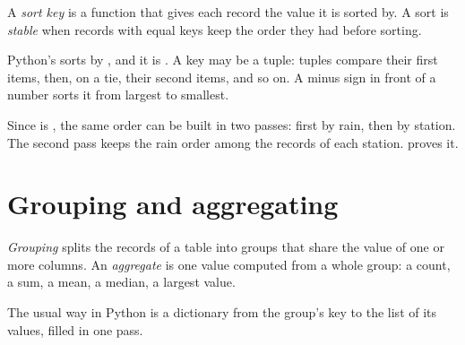 \begin{definition}\label{def:g10:data-tables:sort-key}
A \emph{sort key} is a function that gives each record the value it is sorted by. A sort is
\emph{stable} when records with equal keys keep the order they had before sorting.
\end{definition}

Python's  sorts by , and it is . A key may be a tuple: tuples
compare their first items, then, on a tie, their second items, and so on. A minus sign in front of a number sorts it
from largest to smallest.

\label{lst:g10:data-tables:sort-key}

\label{out:g10:data-tables:sort-key}

\begin{remark}
Since  is , the same order can be built in two passes: first by rain, then by station. The second
pass keeps the rain order among the records of each station.  proves it.
\end{remark}

\section{Grouping and aggregating}\label{sec:g10:data-tables:groups}

\begin{definition}\label{def:g10:data-tables:aggregate}
\emph{Grouping} splits the records of a table into groups that share the value of one or more
columns. An \emph{aggregate} is one value computed from a whole group: a count, a sum, a mean, a
median, a largest value.
\end{definition}

The usual way in Python is a dictionary from the group's key to the list of its values, filled in one pass.

\label{lst:g10:data-tables:group-mean}

